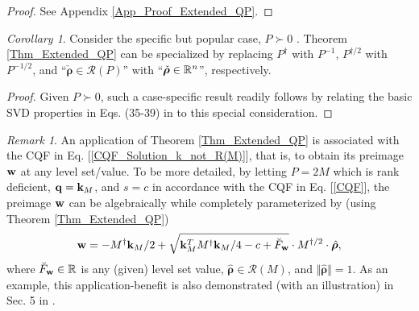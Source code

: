 \documentclass[9pt,twocolumn,twoside,lineno]{pnas-new-1}
\newcommand{\beq}{\begin{eqnarray}}
\newcommand{\eeq}{\end{eqnarray}}
\newcommand{\bfq}{{\bf q}}
\newcommand{\bfw}{{\bf w}}
\newcommand{\bfk}{{\bf k}}
\newcommand{\bfrho}{{\boldsymbol \rho}}
\newcommand{\real}{\mathbb{R}}
\newcommand{\calR}{{\mathcal R}}
\newcommand{\itn}{{\it n}}
\theoremstyle{remark}
\newtheorem{remark}{Remark}[section]
\newtheorem{corollary}{Corollary}[section]
\begin{document}
\begin{proof}
See Appendix \ref{App_Proof_Extended_QP}.
\end{proof}

\begin{corollary}
Consider the specific but popular case, $P\succ 0$ {\rm\citep{Lu(Ye):03(16)}}. Theorem {\rm\ref{Thm_Extended_QP}} can be specialized by replacing $P^\dagger$ with $P^{-1}$, $P^{\dagger/2}$ with $P^{-1/2}$, and ``$\check\bfrho\in\calR(P)$'' with ``$\check\bfrho\in\real^\itn$'', respectively.
\end{corollary}

\begin{proof}
Given $P\succ 0$, such a case-specific result readily follows by relating the basic SVD properties in Eqs. (35-39) in \cite{LiLiHs:20} to this special consideration.
\end{proof}

\begin{remark}
An application of Theorem \ref{Thm_Extended_QP} is associated with the CQF
in Eq. [\ref{CQF_Solution_k_not_R(M)}], that is, to obtain its preimage $\bfw$ at any level set/value. To be more detailed, by letting $P=2M$ which is rank deficient, $\bfq=\bfk_M$, and $s=c$ in accordance with the CQF in Eq. [\ref{CQF}], the preimage $\bfw$ can be algebraically while completely parameterized by (using Theorem \ref{Thm_Extended_QP})
\beq
\bfw=-M^\dagger\bfk_M/2+\sqrt{\bfk_M^TM^\dagger\bfk_M/4-c+\breve F_\bfw}\cdot M^{\dagger/2}\cdot \hat\bfrho,
\label{Preimage_CQF_Solution_k_not_R(M)}
\eeq
where $\breve F_\bfw\in\real$ is any (given) level set value, $\hat\bfrho\in \calR(M)$, and $\Vert\hat\bfrho\Vert=1$. As an example, this application-benefit is also demonstrated (with an illustration) in Sec. 5 in \cite{LiLiHs:20}.
\label{Rem_Thm_Extended_QP_w}
\end{remark}
\end{document}
